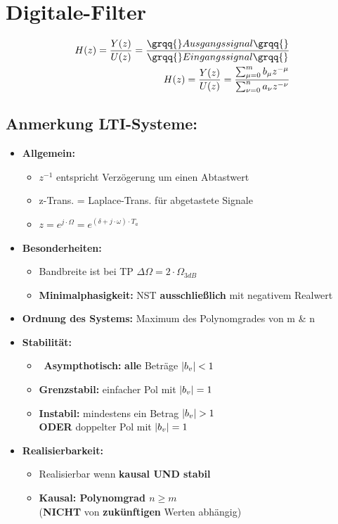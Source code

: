 \documentclass[10pt,a4paper]{article}
\begin{document}
\section{Digitale-Filter}
  \begin{mdframed}[style=exercise]
    \begin{align}
        H(z)=\frac{Y(z)}{U(z)}=\frac{\grqq{}Ausgangssignal\grqq{}}{\grqq{}Eingangssignal\grqq{}}\\
        H(z)=\frac{Y(z)}{U(z)}= \frac{\sum_{\mu=0}^{m} b_\mu z^{-\mu}}{\sum_{\nu=0}^{n} a_\nu z^{-\nu}}
    \end{align}
  \end{mdframed}

\subsection{Anmerkung LTI-Systeme:}
\begin{itemize}
    \item \textbf{Allgemein: }
    	\begin{itemize}
    	\item $z^{-1}$ entspricht Verzögerung um einen Abtastwert
    	\item z-Trans. = Laplace-Trans. für abgetastete Signale
    	\item $z = e^{j\cdot\Omega}=e^{(\delta + j \cdot \omega)\cdot T_a}$
    	\end{itemize}
    \item \textbf{Besonderheiten: }
    	\begin{itemize}
    	\item Bandbreite ist bei TP $\Delta \Omega = 2\cdot\Omega_{3dB}$ 
    	\item \textbf{Minimalphasigkeit: } NST \textbf{ausschließlich} mit negativem Realwert
    	\end{itemize}
    \item \textbf{Ordnung des Systems: } Maximum des Polynomgrades von m \& n
    \item \textbf{Stabilität: }
    	\begin{itemize}
	\item \textbf{Asympthotisch:} \textbf{alle} Beträge $\abs{b_{v}}<1$
	\item \textbf{Grenzstabil:} einfacher Pol mit $\abs{b_{v}}=1$
	\item \textbf{Instabil:} mindestens ein Betrag $\abs{b_{v}}>1$\\
	\textbf{ODER} doppelter Pol mit $\abs{b_{v}}=1$
	\end{itemize}	
    \item \textbf{Realisierbarkeit: }
    	\begin{itemize}
    	\item Realisierbar wenn \textbf{kausal UND stabil}
    	\item \textbf{Kausal: Polynomgrad $n \geq m$}\\
    	(\textbf{NICHT} von \textbf{zukünftigen} Werten abhängig)
    	\end{itemize}
\end{itemize}  
\end{document}
